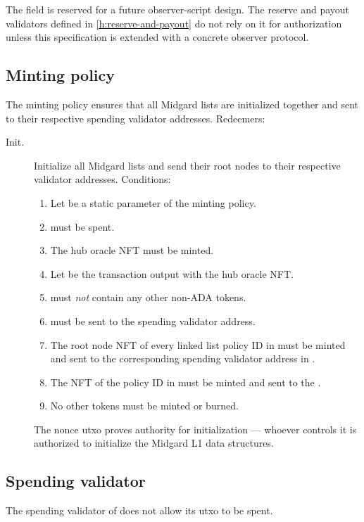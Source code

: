 \documentclass[../midgard.tex]{subfiles}
\begin{document}
The  field is reserved for a future observer-script design.
The reserve and payout validators defined in \cref{h:reserve-and-payout} do not rely on it for authorization unless this specification is extended with a concrete observer protocol.

\subsection{Minting policy}
\label{h:hub-oracle-minting-policy}

The  minting policy ensures that all Midgard lists are initialized together and sent to their respective spending validator addresses.
Redeemers:
\begin{description}
    \item[Init.] Initialize all Midgard lists and send their root nodes to their respective validator addresses.
      Conditions:
        \begin{enumerate}
            \item Let  be a static parameter of the  minting policy.
            \item {} must be spent.
            \item The hub oracle NFT must be minted.
            \item Let  be the transaction output with the hub oracle NFT.
            \item {} must \emph{not} contain any other non-ADA tokens.
            \item {} must be sent to the  spending validator address.
            \item The root node NFT of every linked list policy ID in  must be minted and sent to the corresponding spending validator address in .
            \item The NFT of the  policy ID in  must be minted and sent to the .
            \item No other tokens must be minted or burned.
        \end{enumerate}
    The nonce utxo proves authority for initialization --- whoever controls it is authorized to initialize the Midgard L1 data structures.
\end{description}

\subsection{Spending validator}
\label{h:hub-oracle-spending-validator}

The spending validator of  does not allow its utxo to be spent.
\end{document}
